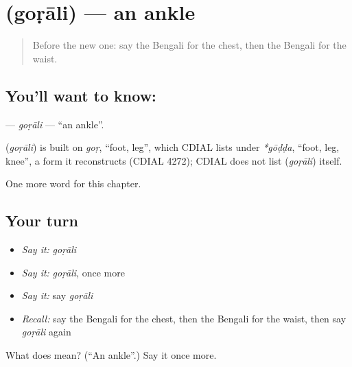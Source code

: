 \section[\texorpdfstring{\bn{গোড়ালি} (goṛāli)}{গোড়ালি (goṛāli)}]{ (goṛāli) — an ankle}

\label{lesson:BN-C123-gorali}



\begin{quote}
Before the new one: say the Bengali for the chest, then the Bengali for the waist.
\end{quote}

\subsection*{You'll want to know: }
\textbf{} — \emph{goṛāli} — \textquotedblleft{}an ankle\textquotedblright{}.

\begin{cousinweb}
\textbf{} (\emph{goṛāli}) is built on \emph{goṛ}, \textquotedblleft{}foot, leg\textquotedblright{}, which CDIAL lists under \emph{*gōḍḍa}, \textquotedblleft{}foot, leg, knee\textquotedblright{}, a form it reconstructs (CDIAL 4272); CDIAL does not list \textbf{} (\emph{goṛāli}) itself.
\end{cousinweb}

\begin{grammarlens}[title={What you've built}]
One more word for this chapter.
\end{grammarlens}

\subsection*{Your turn}
\begin{itemize}
\raggedright
  \item \emph{Say it:} \emph{goṛāli}
  \item \emph{Say it:} \emph{goṛāli}, once more
  \item \emph{Say it:} say \emph{goṛāli}
  \item \emph{Recall:} say the Bengali for the chest, then the Bengali for the waist, then say \emph{goṛāli} again
\end{itemize}

\begin{tcolorbox}[breakable,colback=teal!4,colframe=teal!35!black,title={Before you move on}]
What does  mean? (\textquotedblleft{}An ankle\textquotedblright{}.) Say it once more.
\end{tcolorbox}
